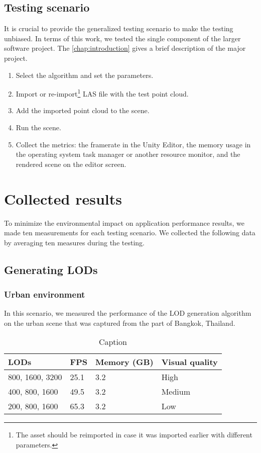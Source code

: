 \subsection{Testing scenario}

It is crucial to provide the generalized testing scenario to make the testing unbiased. In terms of this work, we tested the single component of the larger software project. The \autoref{chap:introduction} gives a brief description of the major project.

\begin{enumerate}
    \item Select the algorithm and set the parameters.
    \item Import or re-import\footnote{The asset should be reimported in case it was imported earlier with different parameters.} LAS file with the test point cloud.
    \item Add the imported point cloud to the scene.
    \item Run the scene.
    \item Collect the metrics: the framerate in the Unity Editor, the memory usage in the operating system task manager or another resource monitor, and the rendered scene on the editor screen.
\end{enumerate}


\section{Collected results}

To minimize the environmental impact on application performance results, we made ten measurements for each testing scenario. We collected the following data by averaging ten measures during the testing.

\subsection{Generating LODs}

\subsubsection{Urban environment}

In this scenario, we measured the performance of the LOD generation algorithm on the urban scene that was captured from the part of Bangkok, Thailand.

\begin{table}[h]
    \centering
    \begin{tabular}{l|l|l|l}
    LODs & FPS & Memory (GB) & Visual quality \\ \hline
    800, 1600,   3200 & 25.1 & 3.2 & High \\
    400, 800,   1600 & 49.5 & 3.2 & Medium \\
    200, 800,   1600 & 65.3 & 3.2 & Low
    \end{tabular}
    
    \caption{Caption}
    \label{tab:results:}
\end{table}

